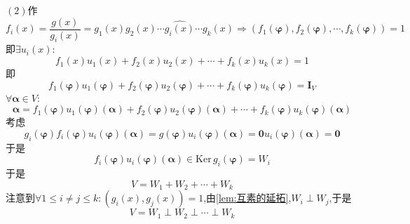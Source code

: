 \begin{formal}
\begin{Proof}
        $(2)$作\[
        f_i\left(x\right)=\frac{g\left(x\right)}{g_i\left(x\right)}=g_1\left(x\right)g_2\left(x\right)\cdots\widehat{g_i\left(x\right)}\cdots g_k\left(x\right)\Longrightarrow\left(
            f_1\left(\bm{\varphi}\right),f_2\left(\bm{\varphi}\right),\cdots, f_k\left(\bm{\varphi}\right)
        \right)=1
        \]即$\exists u_i\left(x\right):$\[
        f_1\left(x\right)u_1\left(x\right)+f_2\left(x\right)u_2\left(x\right)+\cdots+f_k\left(x\right)u_k\left(x\right)=1
        \]即\[
        f_1\left(\bm{\varphi}\right)u_1\left(\bm{\varphi}\right)+f_2\left(\bm{\varphi}\right)u_2\left(\bm{\varphi}\right)+\cdots+f_k\left(\bm{\varphi}\right)u_k\left(\bm{\varphi}\right)=\bm{I}_V
        \]$\forall\bm{\alpha}\in V:$\[
        \bm{\alpha}=f_1\left(\bm{\varphi}\right)u_1\left(\bm{\varphi}\right)\left(\bm{\alpha}\right)+f_2\left(\bm{\varphi}\right)u_2\left(\bm{\varphi}\right)\left(\bm{\alpha}\right)+\cdots+f_k\left(\bm{\varphi}\right)u_k\left(\bm{\varphi}\right)\left(\bm{\alpha}\right)
        \]考虑\[
        g_i\left(
            \bm{\varphi}
        \right)f_i\left(
            \bm{\varphi}
        \right)u_i\left(
            \bm{\varphi}
        \right)\left(
            \bm{\alpha}
        \right)=g\left(
            \bm{\varphi}
        \right)u_i\left(
            \bm{\varphi}
        \right)\left(
            \bm{\alpha}
        \right)=\bm{0}u_i\left(
            \bm{\varphi}
        \right)\left(\bm{\alpha}\right)=\bm{0}
        \]于是\[
        f_i\left(
            \bm{\varphi}
        \right)u_i\left(
            \bm{\varphi}
        \right)\left(
            \bm{\alpha}
            \right)\in \mathrm{Ker}\,g_i\left(
                \bm{\varphi}
            \right)=W_i
        \]于是\[
        V=W_1+W_2+\cdots+W_k
        \]
        注意到$\forall1\leqslant i\neq j\leqslant k:\left(g_i\left(x\right),g_j\left(x\right)\right)=1$,由\cref{lem:互素的延拓},$W_i\perp W_j$,于是\[
        V=W_1\perp W_2\perp\cdots\perp W_k
        \]


\end{Proof}
\end{formal}
